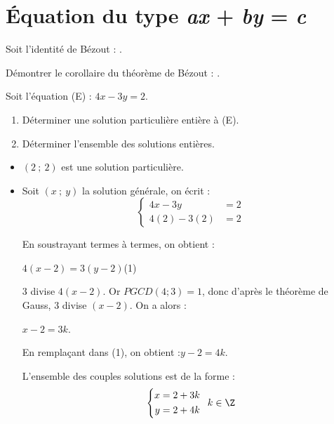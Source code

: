 \documentclass{cornouaille}
\begin{document}
\section{Équation du type \textit{ax} + \textit{by} = \textit{c}}

\begin{exercice}
  Soit l'identité de Bézout :  \fg .

  Démontrer le corollaire du théorème de Bézout :  \fg .
\end{exercice}



\begin{exercice}[]
\label{exo-eq_diophantienne}
Soit l'équation (E) : $4x-3y = 2$.
\begin{enumerate}
\item Déterminer une solution particulière entière à (E).
\item Déterminer l'ensemble des solutions entières.
\end{enumerate}
\end{exercice}
\begin{solution}
  \begin{itemize}
  \item $(2\ ;\ 2)$ est une solution particulière.
  \item Soit $(x\ ;\ y)$ la solution générale, on écrit :
    $$\left\{\begin{aligned}
        4x-3y&=2\\
        4(2)-3(2)&=2\end{aligned}\right.$$
    
En soustrayant termes à termes, on obtient : 

$4(x-2)=3(y-2)$\enskip (1)

3 divise $4(x-2)$. Or $PGCD(4;3)=1$, donc d'après le théorème de
Gauss, 3 divise $(x-2)$. On a alors :

$x-2=3k$.

En remplaçant dans (1), on obtient :\enskip $y-2=4k$.

L'ensemble des couples solutions est de la forme :
$$\left\{\begin{aligned}
x&=2+3k\\
y&=2+4k\end{aligned}\right.\enskip k\in\Z$$
\end{itemize}
\end{solution}
\end{document}

